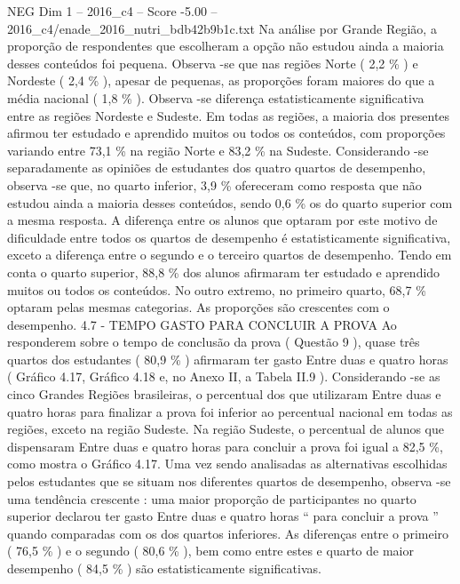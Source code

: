 \begin{textsample}{NEG Dim 1 – 2016\_c4 – Score -5.00 – 2016\_c4/enade\_2016\_nutri\_bdb42b9b1c.txt}
Na análise por Grande Região, a proporção de respondentes que escolheram a opção não estudou ainda a maioria desses conteúdos foi pequena.
Observa -se que nas regiões Norte ( 2,2 \% ) e Nordeste ( 2,4 \% ), apesar de pequenas, as proporções foram maiores do que a média nacional ( 1,8 \% ).
Observa -se diferença estatisticamente significativa entre as regiões Nordeste e Sudeste.
Em todas as regiões, a maioria dos presentes afirmou ter estudado e aprendido muitos ou todos os conteúdos, com proporções variando entre 73,1 \% na região Norte e 83,2 \% na Sudeste.
Considerando -se separadamente as opiniões de estudantes dos quatro quartos de desempenho, observa -se que, no quarto inferior, 3,9 \% ofereceram como resposta que não estudou ainda a maioria desses conteúdos, sendo 0,6 \% os do quarto superior com a mesma resposta.
A diferença entre os alunos que optaram por este motivo de dificuldade entre todos os quartos de desempenho é estatisticamente significativa, exceto a diferença entre o segundo e o terceiro quartos de desempenho.
Tendo em conta o quarto superior, 88,8 \% dos alunos afirmaram ter estudado e aprendido muitos ou todos os conteúdos.
No outro extremo, no primeiro quarto, 68,7 \% optaram pelas mesmas categorias.
As proporções são crescentes com o desempenho. 4.7 - TEMPO GASTO PARA CONCLUIR A PROVA Ao responderem sobre o tempo de conclusão da prova ( Questão 9 ), quase três quartos dos estudantes ( 80,9 \% ) afirmaram ter gasto Entre duas e quatro horas ( Gráfico 4.17, Gráfico 4.18 e, no Anexo II, a Tabela II.9 ).
Considerando -se as cinco Grandes Regiões brasileiras, o percentual dos que utilizaram Entre duas e quatro horas para finalizar a prova foi inferior ao percentual nacional em todas as regiões, exceto na região Sudeste.
Na região Sudeste, o percentual de alunos que dispensaram Entre duas e quatro horas para concluir a prova foi igual a 82,5 \%, como mostra o Gráfico 4.17.
Uma vez sendo analisadas as alternativas escolhidas pelos estudantes que se situam nos diferentes quartos de desempenho, observa -se uma tendência crescente : uma maior proporção de participantes no quarto superior declarou ter gasto Entre duas e quatro horas “ para concluir a prova ” quando comparadas com os dos quartos inferiores.
As diferenças entre o primeiro ( 76,5 \% ) e o segundo ( 80,6 \% ), bem como entre estes e quarto de maior desempenho ( 84,5 \% ) são estatisticamente significativas.

\end{textsample}
